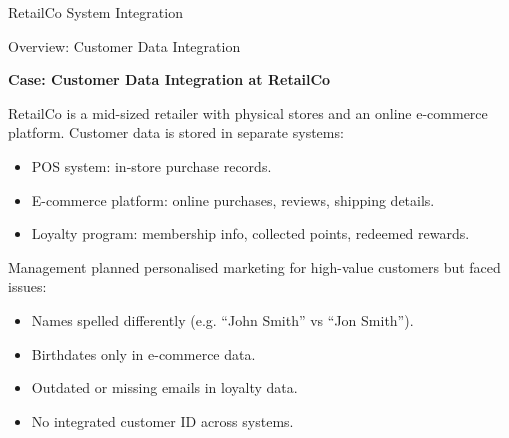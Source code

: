 \documentclass[aspectratio=169, table]{beamer}
\begin{document}
\begin{frame}{RetailCo System Integration}
	\vspace{20pt}
	\centering
\end{frame}


\begin{frame}{Overview: Customer Data Integration}
	\vspace{20pt}
	
	\textbf{Case: Customer Data Integration at RetailCo}
	
	RetailCo is a mid-sized retailer with physical stores and an online e-commerce platform. Customer data is stored in separate systems:
	
	\begin{itemize}
		\item POS system: in-store purchase records.
		\item E-commerce platform: online purchases, reviews, shipping details.
		\item Loyalty program: membership info, collected points, redeemed rewards.
	\end{itemize}
	
	Management planned personalised marketing for high-value customers but faced issues:
	
	\begin{itemize}
		\item Names spelled differently (e.g. “John Smith” vs “Jon Smith”).
		\item Birthdates only in e-commerce data.
		\item Outdated or missing emails in loyalty data.
		\item No integrated customer ID across systems.
	\end{itemize}
	
\end{frame}
\end{document}
